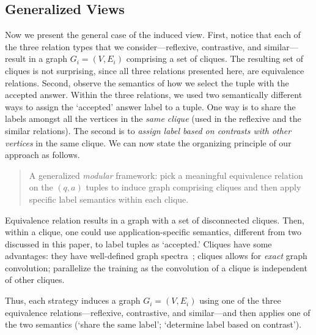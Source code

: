 \subsection{Generalized Views}
\label{sub:Generalized Views}
Now we present the general case of the induced view. First, notice that each of the three relation types that we consider---reflexive, contrastive, and similar---result in a graph $G_i = (V, E_i)$ comprising a set of cliques. The resulting set of cliques is not surprising, since all three relations presented here, are equivalence relations. Second, observe the semantics of how we select the tuple with the accepted answer. Within the three relations, we used two semantically different ways to assign the `accepted' answer label to a tuple. One way is to share the labels amongst all the vertices in the \textit{same clique} (used in the reflexive and the similar relations). The second is to \textit{assign label based on contrasts with other vertices} in the same clique. We can now state the organizing principle of our approach as follows.
\begin{quote}
  A generalized \textit{modular} framework: pick a meaningful equivalence relation on the $(q,a)$ tuples to induce graph comprising cliques and then apply specific label semantics within each clique.
\end{quote}

Equivalence relation results in a graph with a set of disconnected cliques. Then, within a clique, one could use application-specific semantics, different from two discussed in this paper, to label tuples as `accepted.'
Cliques have some advantages: they have well-defined graph spectra~\cite[p. 6]{Chung1997}; cliques allows for \textit{exact} graph convolution; parallelize the training as the convolution of a clique is independent of other cliques.

Thus, each strategy induces a graph $G_i=(V,E_i)$ using one of the three equivalence relations---reflexive, contrastive, and similar---and then applies one of the two semantics (`share the same label'; `determine label based on contrast').
